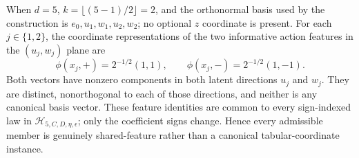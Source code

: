 When \(d=5\), \(k=\lfloor(5-1)/2\rfloor=2\), and the orthonormal basis used by the construction is \(e_0,u_1,w_1,u_2,w_2\); no optional \(z\) coordinate is present. For each \(j\in\{1,2\}\), the coordinate representations of the two informative action features in the \((u_j,w_j)\) plane are
\[
\phi(x_j,+)=2^{-1/2}(1,1),
\qquad
\phi(x_j,-)=2^{-1/2}(1,-1).
\]
Both vectors have nonzero components in both latent directions \(u_j\) and \(w_j\). They are distinct, nonorthogonal to each of those directions, and neither is any canonical basis vector. These feature identities are common to every sign-indexed law in \(\mathcal H_{5,C,D,\eta,\epsilon}\); only the coefficient signs change. Hence every admissible member is genuinely shared-feature rather than a canonical tabular-coordinate instance.